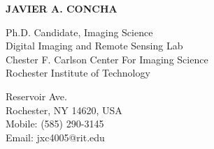\documentclass[11pt]{res} %
\begin{document}
 
{\centering \Large \bf JAVIER A. CONCHA\par} %
\vspace{0.3in}                                         
\begin{multicols}{2}
{\raggedright Ph.D. Candidate, Imaging Science \\ Digital Imaging and Remote Sensing Lab\\Chester F. Carlson Center For Imaging Science \\ Rochester Institute of Technology\\}
{ Reservoir Ave.\\Rochester, NY 14620, USA\\Mobile: (585) 290-3145\\Email: jxc4005@rit.edu\\}
\end{multicols}
\vspace{-0.4in} 
\hrulefill
\end{document}
